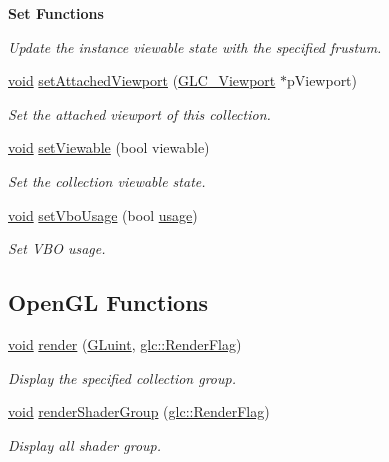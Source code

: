 \begin{Indent}{\bf Set Functions}
\begin{DoxyCompactItemize}
\begin{DoxyCompactList}\small\item\em Update the instance viewable state with the specified frustum. \end{DoxyCompactList}\item 
\hyperlink{group___u_a_v_objects_plugin_ga444cf2ff3f0ecbe028adce838d373f5c}{void} \hyperlink{class_g_l_c__3_d_view_collection_ae80787c653c8d87baf16eab0bd6a583d}{set\-Attached\-Viewport} (\hyperlink{class_g_l_c___viewport}{G\-L\-C\-\_\-\-Viewport} $\ast$p\-Viewport)
\begin{DoxyCompactList}\small\item\em Set the attached viewport of this collection. \end{DoxyCompactList}\item 
\hyperlink{group___u_a_v_objects_plugin_ga444cf2ff3f0ecbe028adce838d373f5c}{void} \hyperlink{class_g_l_c__3_d_view_collection_abee535e6f28b78acd08823febdd66fb7}{set\-Viewable} (bool viewable)
\begin{DoxyCompactList}\small\item\em Set the collection viewable state. \end{DoxyCompactList}\item 
\hyperlink{group___u_a_v_objects_plugin_ga444cf2ff3f0ecbe028adce838d373f5c}{void} \hyperlink{class_g_l_c__3_d_view_collection_aba23ec5228337f17fd7cfc32481d072b}{set\-Vbo\-Usage} (bool \hyperlink{glext_8h_ae759ed0394ed5353d8bef2fb755305da}{usage})
\begin{DoxyCompactList}\small\item\em Set V\-B\-O usage. \end{DoxyCompactList}\end{DoxyCompactItemize}
\end{Indent}
\subsection*{Open\-G\-L Functions}
\begin{DoxyCompactItemize}
\item 
\hyperlink{group___u_a_v_objects_plugin_ga444cf2ff3f0ecbe028adce838d373f5c}{void} \hyperlink{class_g_l_c__3_d_view_collection_a1143b3497b21f7c43f5f75c76c49d512}{render} (\hyperlink{glext_8h_a2f0c8cd5c21f9fcbd931c3f48bc90dfc}{G\-Luint}, \hyperlink{namespaceglc_a51a421b53283d5996142222b9baca26c}{glc\-::\-Render\-Flag})
\begin{DoxyCompactList}\small\item\em Display the specified collection group. \end{DoxyCompactList}\item 
\hyperlink{group___u_a_v_objects_plugin_ga444cf2ff3f0ecbe028adce838d373f5c}{void} \hyperlink{class_g_l_c__3_d_view_collection_a86e0c0fbc89de1c0bce1820b71385d49}{render\-Shader\-Group} (\hyperlink{namespaceglc_a51a421b53283d5996142222b9baca26c}{glc\-::\-Render\-Flag})
\begin{DoxyCompactList}\small\item\em Display all shader group. \end{DoxyCompactList}\end{DoxyCompactItemize}


